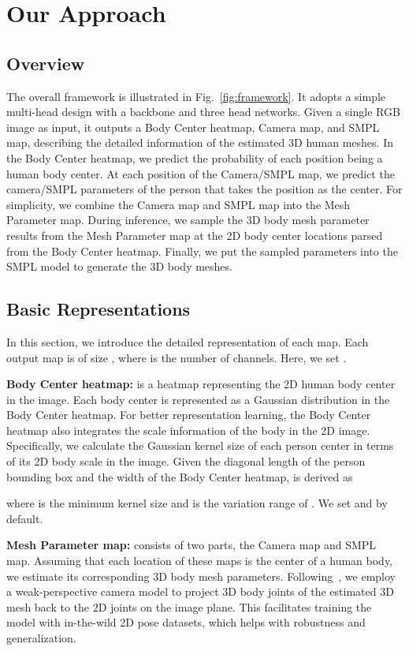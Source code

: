 \documentclass[10pt,twocolumn,letterpaper]{article}
\begin{document}
\section{Our Approach}

\vspace{-1mm}
\subsection{Overview}

The overall framework is illustrated in Fig.~\ref{fig:framework}.
It adopts a simple multi-head design with a backbone and three head networks.
Given a single RGB image as input, it outputs a Body Center heatmap, Camera map, and SMPL map, describing the detailed information of the estimated 3D human meshes. 
In the Body Center heatmap, we predict the probability of each position being a human body center. 
At each position of the Camera/SMPL map, we predict the camera/SMPL parameters of the person that takes the position as the center. 
For simplicity, we combine the Camera map and SMPL map into the Mesh Parameter map. 
During inference, we sample the 3D body mesh parameter results from the Mesh Parameter map at the 2D body center locations parsed from the Body Center heatmap. 
Finally, we put the sampled parameters into the SMPL model to generate the 3D body meshes. 

\subsection{Basic Representations~\label{sec:representations}}

In this section, we introduce the detailed representation of each map. Each output map is of size , where  is the number of channels. Here, we set . 

\textbf{Body Center heatmap:}  is a heatmap representing the 2D human body center in the image. 
Each body center is represented as a Gaussian distribution in the Body Center heatmap. 
For better representation learning, the Body Center heatmap also integrates the scale information of the body in the 2D image.
Specifically, we calculate the Gaussian kernel size  of each person center in terms of its 2D body scale in the image. 
Given the diagonal length  of the person bounding box and the width  of the Body Center heatmap,  is derived as

where  is the minimum kernel size and  is the variation range of . We set  and   by default.

\textbf{Mesh Parameter map:}  consists of two parts, the Camera map and SMPL map.
Assuming that each location of these maps is the center of a human body, we estimate its corresponding 3D body mesh parameters.
Following~\cite{hmr,sun2019dsd-satn}, we employ a weak-perspective camera model to project  3D body joints  of the estimated 3D mesh back to the 2D joints  on the image plane. 
This facilitates training the model with in-the-wild 2D pose datasets, which helps with robustness and generalization. 
 
\end{document}
